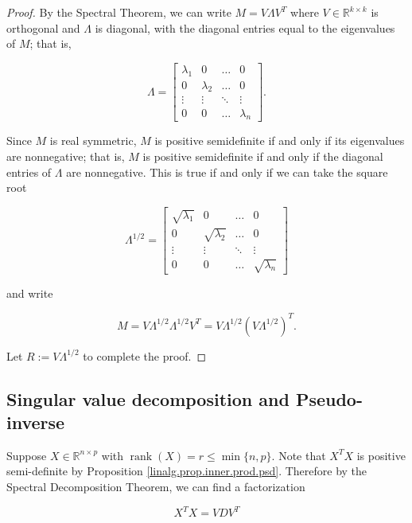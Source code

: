 \begin{proof}

By the Spectral Theorem, we can write \(M = V\Lambda V^T\) where \(V \in \mathbb{R}^{k \times k}\) is orthogonal and \(\Lambda\) is diagonal, with the diagonal entries equal to the eigenvalues of \(M\); that is,

\[
\Lambda = \begin{bmatrix} \lambda_1 & 0 & \ldots & 0 \\
0 & \lambda_2 & \ldots & 0 \\
\vdots & \vdots & \ddots & \vdots \\
0 & 0 & \ldots & \lambda_n
\end{bmatrix}.
\]

Since \(M\) is real symmetric, \(M\) is positive semidefinite if and only if its eigenvalues are nonnegative; that is, \(M\) is positive semidefinite if and only if the diagonal entries of \(\Lambda\) are nonnegative. This is true if and only if we can take the square root

\[
\Lambda^{1/2} = \begin{bmatrix} \sqrt{\lambda_1} & 0 & \ldots & 0 \\
0 & \sqrt{\lambda_2} & \ldots & 0 \\
\vdots & \vdots & \ddots & \vdots \\
0 & 0 & \ldots & \sqrt{\lambda_n}
\end{bmatrix}
\]

and write

\[
M = V \Lambda^{1/2} \Lambda^{1/2} V^T =  V \Lambda^{1/2}  \left(  V \Lambda^{1/2}  \right)^T.
\]

Let \(R :=  V \Lambda^{1/2} \) to complete the proof.

\end{proof}

\subsection{Singular value decomposition and Pseudo-inverse}\label{linalg.sec.svd}

Suppose \(X \in \mathbb{R}^{n \times p}\) with \(\operatorname{rank}(X) = r \leq \min\{n, p\}\). Note that \(X^TX\) is positive semi-definite by Proposition \ref{linalg.prop.inner.prod.psd}. Therefore by the Spectral Decomposition Theorem, we can find a factorization

\begin{equation}\label{linalg.svd.1.decomp}
X^TX = V D V^T
\end{equation}

